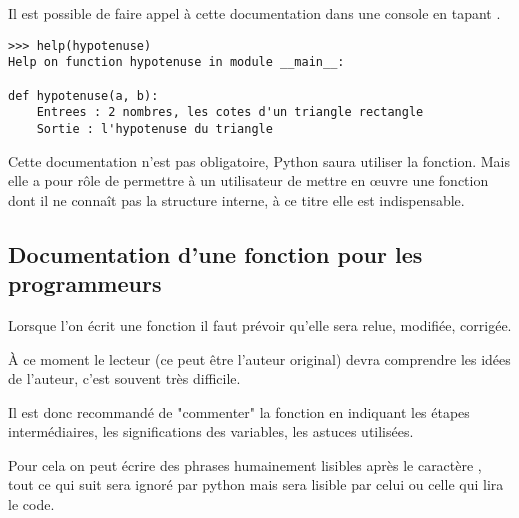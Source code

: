 Il est possible de faire appel à cette documentation dans une console en tapant .
\begin{lstlisting}
>>> help(hypotenuse)
Help on function hypotenuse in module __main__:

def hypotenuse(a, b):
    Entrees : 2 nombres, les cotes d'un triangle rectangle
    Sortie : l'hypotenuse du triangle
\end{lstlisting}
Cette documentation n'est pas obligatoire, Python saura  utiliser la fonction. Mais elle a pour rôle de permettre à un utilisateur de mettre en œuvre une fonction dont il ne connaît pas la structure interne, à ce titre elle est indispensable.
\newpage
\subsection{Documentation d'une fonction pour les programmeurs}
Lorsque l'on écrit une fonction il faut prévoir qu'elle sera relue, modifiée, corrigée. 

À ce moment le lecteur (ce peut être l'auteur original) devra comprendre les idées de l'auteur, c'est souvent très difficile.

Il est donc recommandé de "commenter" la fonction en indiquant les étapes intermédiaires, les significations des variables, les astuces utilisées.

Pour cela on peut écrire des phrases humainement lisibles après le caractère \type{\#}, tout ce qui suit sera ignoré par python mais sera lisible par celui ou celle qui lira le code.

